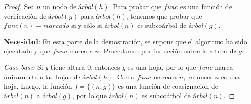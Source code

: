 \begin{proof}
    
    Sea $n$ un nodo de $árbol(h)$. Para probar que $func$ es una función de verificación de $árbol(g)$ para $árbol(h)$, tenemos que probar que $func(n) = marcado$ si y sólo si $árbol(n)$ es subcoárbol de $árbol(g)$.

    \textbf{Necesidad}: En esta parte de la demostración, se supone que el algoritmo ha sido ejecutado y que $func$ marca a $n$. Procedamos por inducción sobre la altura de $g$.
    
    \emph{Caso base:} Si $g$ tiene altura 0, entonces $g$ es una hoja, por lo que $func$ marca únicamente a las hojas de $árbol(h)$. Como $func$ marca a $n$, entonces $n$ es una hoja. Luego, la función $f=\{(n,g)\}$ es una función de coasignación de $árbol(n)$ a $árbol(g)$, por lo que $árbol(n)$ es subcoárbol de $árbol(n)$.
    

\end{proof}
